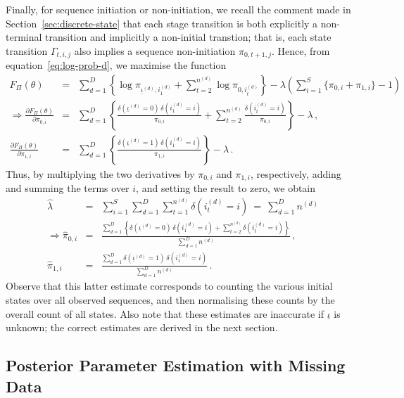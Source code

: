 \documentclass[a4paper]{article}
\begin{document}
Finally, for sequence initiation or non-initiation, we recall the comment made in Section~\ref{sec:discrete-state} that each stage transition is both explicitly a non-terminal
transition and implicitly a non-initial transtion; that is, each state transition $\Gamma_{t,i,j}$ also implies a sequence non-initiation $\pi_{0,t+1,j}$.
Hence, from equation~\eqref{eq:log-prob-d}, we maximise the function
\begin{eqnarray}
  F_{\Pi}(\theta) & = & \sum_{d=1}^D \left\{\log\pi_{\underline{\iota}^{(d)},i_1^{(d)}}+\sum_{t=2}^{n^{(d)}}\log\pi_{0,i_{t}^{(d)}}\right\}
-\lambda\left(\sum_{i=1}^{S}\{\pi_{0,i}+\pi_{1,i}\}-1\right)
\label{eq:F:pi}
\\
\Rightarrow\frac{\partial F_{\Pi}(\theta)}{\partial\pi_{0,i}} & = &
  \sum_{d=1}^D \left\{\frac{\delta(\underline{\iota}^{(d)}\!=\!0)\,\delta(i_1^{(d)}\!=\!i)}{\pi_{0,i}}
+\sum_{t=2}^{n^{(d)}}\frac{\delta(i_t^{(d)}\!=\!i)}{\pi_{0,i}}\right\}-\lambda\,,
\nonumber\\
\frac{\partial F_{\Pi}(\theta)}{\partial\pi_{1,i}} & = &
  \sum_{d=1}^D \left\{\frac{\delta(\underline{\iota}^{(d)}\!=\!1)\,\delta(i_1^{(d)}\!=\!i)}{\pi_{1,i}}\right\}-\lambda\,.
\end{eqnarray}
Thus, by multiplying the two derivatives by $\pi_{0,i}$ and $\pi_{1,i}$, respectively, adding and summing the terms over $i$, and setting the result to zero, we obtain
\begin{eqnarray}
\hat{\lambda} & = & \sum_{i=1}^{S}\sum_{d=1}^{D}\sum_{t=1}^{n^{(d)}}\delta(i_t^{(d)}\!=\!i)~=~\sum_{d=1}^{D}n^{(d)}
\nonumber\\
\Rightarrow \hat{\pi}_{0,i} & = & \frac{\sum_{d=1}^{D} \left\{\delta(\underline{\iota}^{(d)}\!=\!0)\,\delta(i_1^{(d)}\!=\!i)
  +\sum_{t=2}^{n^{(d)}}\delta(i_t^{(d)}\!=\!i)\right\}}
                                                               {\sum_{d=1}^{D}n^{(d)}}\,,
\nonumber\\
\hat{\pi}_{1,i} & = & \frac{\sum_{d=1}^{D} \delta(\underline{\iota}^{(d)}\!=\!1)\,\delta(i_1^{(d)}\!=\!i)}
                                                               {\sum_{d=1}^{D}n^{(d)}}\,.
\end{eqnarray}
Observe that this latter estimate corresponds to counting the various initial states over all observed sequences, and then normalising these counts by the overall count of all states.
Also note that these estimates are inaccurate if $\underline{\iota}$ is unknown; the correct estimates are derived in the next section.

\subsection{Posterior Parameter Estimation with Missing Data}\label{sec:estimate-missing}
\end{document}
